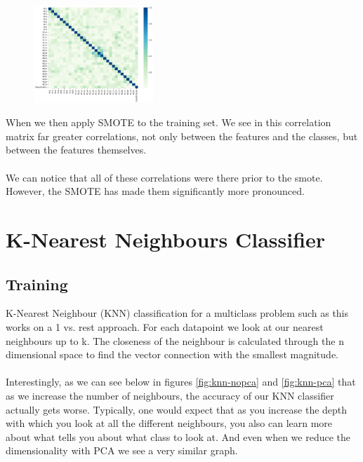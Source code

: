 \documentclass[12pt,a4paper]{article}
\begin{document}
    \begin{figure}
        \centering
        \includegraphics[width=0.4\textwidth]{pca_postsmote_heatmap}
    \end{figure}

    When we then apply SMOTE to the training set. We see in this correlation matrix far greater
    correlations, not only between the features and the classes, but between the features themselves.
    \\
    \\
    We can notice that all of these correlations were there prior to the smote. However, the SMOTE
    has made them significantly more pronounced.

    \clearpage
    \section{K-Nearest Neighbours Classifier}
    \subsection{Training}
    K-Nearest Neighbour (KNN) classification for a multiclass problem such as this works on a 1 vs. rest
    approach. For each datapoint we look at our nearest neighbours up to k. The closeness of the neighbour
    is calculated through the n dimensional space to find the vector connection with the smallest magnitude.
    \\
    \\
    Interestingly, as we can see below in figures \ref{fig:knn-nopca} and \ref{fig:knn-pca} that as we 
    increase the number of neighbours, the accuracy of our KNN classifier actually gets worse. Typically,
    one would expect that as you increase the depth with which you look at all the different neighbours,
    you also can learn more about what tells you about what class to look at. And even when we reduce the
    dimensionality with PCA we see a very similar graph.
\end{document}
